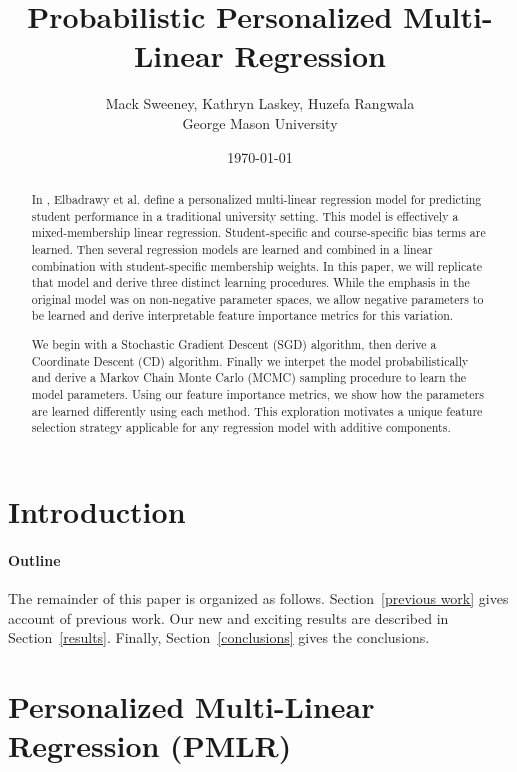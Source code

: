 \documentclass[10pt]{proc}
\title{Probabilistic Personalized Multi-Linear Regression}
\author{
    Mack Sweeney, Kathryn Laskey, Huzefa Rangwala\\
        George Mason University
}
\date{\today}
\begin{document}
\maketitle


\begin{abstract}

In \cite{elbadrawy_personalized_2015}, Elbadrawy et al. define a personalized
multi-linear regression model for predicting student performance in a
traditional university setting. This model is effectively a mixed-membership
linear regression. Student-specific and course-specific bias terms are learned.
Then several regression models are learned and combined in a linear combination
with student-specific membership weights. In this paper, we will replicate
that model and derive three distinct learning procedures. While the emphasis in
the original model was on non-negative parameter spaces, we allow negative
parameters to be learned and derive interpretable feature importance metrics for
this variation.

We begin with a Stochastic Gradient Descent (SGD) algorithm, then derive a
Coordinate Descent (CD) algorithm. Finally we interpet the model
probabilistically and derive a Markov Chain Monte Carlo (MCMC) sampling
procedure to learn the model parameters. Using our feature importance metrics,
we show how the parameters are learned differently using each method. This
exploration motivates a unique feature selection strategy applicable for any
regression model with additive components.

\end{abstract}


\section{Introduction}

\paragraph{Outline}
The remainder of this paper is organized as follows.
Section~\ref{previous work} gives account of previous work.
Our new and exciting results are described in Section~\ref{results}.
Finally, Section~\ref{conclusions} gives the conclusions.


\section{Personalized Multi-Linear Regression (PMLR)}
\end{document}
